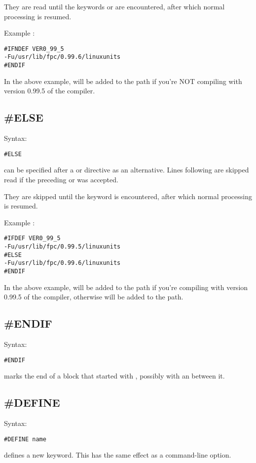 They are read until the keywords  or  are
encountered, after which normal processing is resumed.

Example :
\begin{verbatim}
#IFNDEF VER0_99_5
-Fu/usr/lib/fpc/0.99.6/linuxunits
#ENDIF
\end{verbatim}
In the above example,  will be added to
the path if you're NOT compiling with version 0.99.5 of the compiler.

\subsection{\#ELSE}
Syntax:
\begin{verbatim}
#ELSE
\end{verbatim}
 can be specified after a  or 
directive as an alternative.
Lines following  are skipped read if the preceding 
or  was accepted.

They are skipped until the keyword  is
encountered, after which normal processing is resumed.

Example :
\begin{verbatim}
#IFDEF VER0_99_5
-Fu/usr/lib/fpc/0.99.5/linuxunits
#ELSE
-Fu/usr/lib/fpc/0.99.6/linuxunits
#ENDIF
\end{verbatim}
In the above example,  will be added to
the path if you're compiling with version 0.99.5 of the compiler,
otherwise  will be added to the path.

\subsection{\#ENDIF}
Syntax:
\begin{verbatim}
#ENDIF
\end{verbatim}
 marks the end of a block that started with ,
possibly with an  between it.

\subsection{\#DEFINE}
Syntax:
\begin{verbatim}
#DEFINE name
\end{verbatim}
 defines a new keyword. This has the same effect as a
  command-line option.

